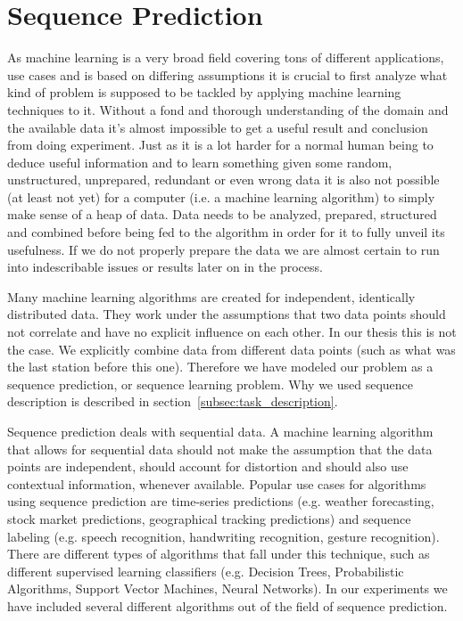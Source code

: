 \section{Sequence Prediction}
As machine learning is a very broad field covering tons of different applications, use cases and is based on differing assumptions it is crucial to first analyze what kind of problem is supposed to be tackled by applying machine learning techniques to it. Without a fond and thorough understanding of the domain and the available data it's almost impossible to get a useful result and conclusion from doing experiment. Just as it is a lot harder for a normal human being to deduce useful information and to learn something given some random, unstructured, unprepared, redundant or even wrong data it is also not possible (at least not yet) for a computer (i.e. a machine learning algorithm) to simply make sense of a heap of data. Data needs to be analyzed, prepared, structured and combined before being fed to the algorithm in order for it to fully unveil its usefulness. If we do not properly prepare the data we are almost certain to run into indescribable issues or results later on in the process.

Many machine learning algorithms are created for independent, identically distributed data. They work under the assumptions that two data points should not correlate and have no explicit influence on each other. In our thesis this is not the case. We explicitly combine data from different data points (such as what was the last station before this one). Therefore we have modeled our problem as a sequence prediction, or sequence learning problem. Why we used sequence description is described in section~\ref{subsec:task_description}. 

Sequence prediction deals with sequential data. A machine learning algorithm that allows for sequential data should not make the assumption that the data points are independent, should account for distortion and should also use contextual information, whenever available. Popular use cases for algorithms using sequence prediction are time-series predictions (e.g. weather forecasting, stock market predictions, geographical tracking predictions) and sequence labeling (e.g. speech recognition, handwriting recognition, gesture recognition). There are different types of algorithms that fall under this technique, such as different supervised learning classifiers (e.g. Decision Trees, Probabilistic Algorithms, Support Vector Machines, Neural Networks). In our experiments we have included several different algorithms out of the field of sequence prediction.

